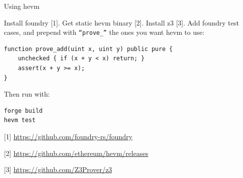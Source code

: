 \documentclass[aspectratio=169]{beamer}
\begin{document}
\begin{frame}[fragile=singleslide]{Using hevm}

Install foundry [1]. Get static hevm binary [2]. Install z3 [3]. Add foundry test cases, and prepend with \texttt{``prove\_''} the ones you want hevm to use:

\begin{Verbatim}[frame=single, framerule=0.2mm, framesep=2mm,fontsize=\footnotesize]
function prove_add(uint x, uint y) public pure {
    unchecked { if (x + y < x) return; }
    assert(x + y >= x);
}
\end{Verbatim}

Then run with:

\begin{Verbatim}[frame=single, framerule=0.2mm, framesep=2mm,fontsize=\footnotesize]
forge build
hevm test
\end{Verbatim}


\bigskip

[1] \url{https://github.com/foundry-rs/foundry}

[2] \url{https://github.com/ethereum/hevm/releases}

[3] \url{https://github.com/Z3Prover/z3}
\end{frame}


%


%
%
%
%
%
%
\end{document}
